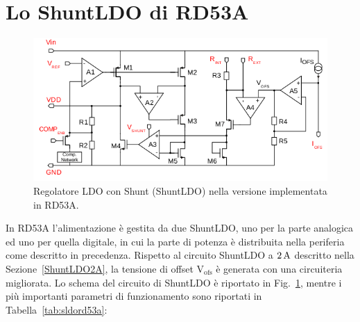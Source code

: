 \section{Lo ShuntLDO di RD53A}
\begin{figure}
\centering
\includegraphics[width=\textwidth]{Immagini/SLDO_RD53A}
\caption{Regolatore LDO con Shunt (ShuntLDO) nella versione implementata in RD53A.}
\label{SLDO_RD53A}
\end{figure}
In RD53A l'alimentazione è gestita da due ShuntLDO, uno per la parte analogica ed uno per quella digitale, in cui la parte di potenza \`e distribuita nella periferia come descritto in precedenza. Rispetto al circuito ShuntLDO a $2\rm \, A$ descritto nella Sezione~\ref{ShuntLDO2A}, la tensione di offset $\mathrm{V_{ofs}}$ è generata con una circuiteria migliorata. Lo schema del circuito di ShuntLDO è riportato in Fig.~\ref{SLDO_RD53A}, mentre i pi\`u importanti parametri di funzionamento sono riportati in Tabella~\ref{tab:sldord53a}:

